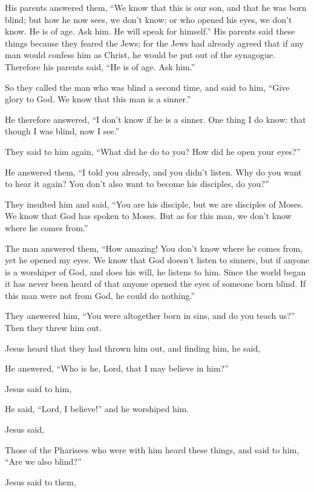 {\par }{\PP {}His parents answered them, “We know that this is our son, and that he was born blind;
but how he now sees, we don’t know; or who opened his eyes, we don’t know. He is of age. Ask him. He will speak for himself.”
His parents said these things because they feared the Jews; for the Jews had already agreed that if any man would confess him as Christ, he would be put out of the synagogue.
Therefore his parents said, “He is of age. Ask him.”
\par }{\PP {}So they called the man who was blind a second time, and said to him, “Give glory to God. We know that this man is a sinner.”
\par }{\PP {}He therefore answered, “I don’t know if he is a sinner. One thing I do know: that though I was blind, now I see.”
\par }{\PP {}They said to him again, “What did he do to you? How did he open your eyes?”
\par }{\PP {}He answered them, “I told you already, and you didn’t listen. Why do you want to hear it again? You don’t also want to become his disciples, do you?”
\par }{\PP {}They insulted him and said, “You are his disciple, but we are disciples of Moses.
We know that God has spoken to Moses. But as for this man, we don’t know where he comes from.”
\par }{\PP {}The man answered them, “How amazing! You don’t know where he comes from, yet he opened my eyes.
We know that God doesn’t listen to sinners, but if anyone is a worshiper of God, and does his will, he listens to him.
Since the world began it has never been heard of that anyone opened the eyes of someone born blind.
If this man were not from God, he could do nothing.”
\par }{\PP {}They answered him, “You were altogether born in sins, and do you teach us?” Then they threw him out.
\par }{\PP {}Jesus heard that they had thrown him out, and finding him, he said,
{}
\par }{\PP {}He answered, “Who is he, Lord, that I may believe in him?”
\par }{\PP {}Jesus said to him,
{}
\par }{\PP {}He said, “Lord, I believe!” and he worshiped him.
\par }{\PP {}Jesus said,
{}
\par }{\PP {}Those of the Pharisees who were with him heard these things, and said to him, “Are we also blind?”
\par }{\PP {}Jesus said to them,
{}

}
